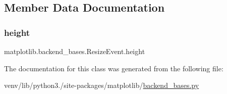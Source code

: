 \subsection{Member Data Documentation}
\mbox{\label{classmatplotlib_1_1backend__bases_1_1ResizeEvent_acb8d277420a1f2785d679252c762e645}} 
\subsubsection{\texorpdfstring{height}{height}}
{\footnotesize\ttfamily matplotlib.\+backend\+\_\+bases.\+Resize\+Event.\+height}



The documentation for this class was generated from the following file\+:\begin{DoxyCompactItemize}
\item 
venv/lib/python3./site-\/packages/matplotlib/\hyperlink{backend__bases_8py}{backend\+\_\+bases.\+py}\end{DoxyCompactItemize}
